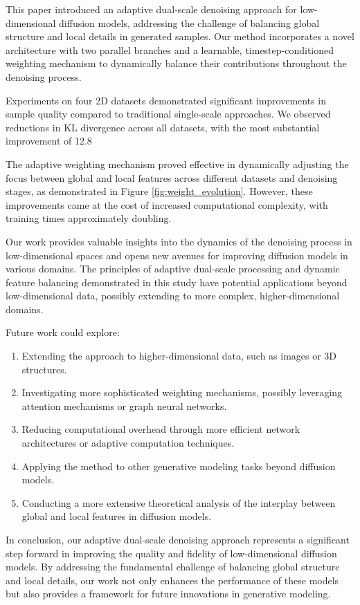 \documentclass{article} %
\begin{document}
This paper introduced an adaptive dual-scale denoising approach for low-dimensional diffusion models, addressing the challenge of balancing global structure and local details in generated samples. Our method incorporates a novel architecture with two parallel branches and a learnable, timestep-conditioned weighting mechanism to dynamically balance their contributions throughout the denoising process.

Experiments on four 2D datasets demonstrated significant improvements in sample quality compared to traditional single-scale approaches. We observed reductions in KL divergence across all datasets, with the most substantial improvement of 12.8%

The adaptive weighting mechanism proved effective in dynamically adjusting the focus between global and local features across different datasets and denoising stages, as demonstrated in Figure \ref{fig:weight_evolution}. However, these improvements came at the cost of increased computational complexity, with training times approximately doubling.

Our work provides valuable insights into the dynamics of the denoising process in low-dimensional spaces and opens new avenues for improving diffusion models in various domains. The principles of adaptive dual-scale processing and dynamic feature balancing demonstrated in this study have potential applications beyond low-dimensional data, possibly extending to more complex, higher-dimensional domains.

Future work could explore:

\begin{enumerate}
    \item Extending the approach to higher-dimensional data, such as images or 3D structures.
    \item Investigating more sophisticated weighting mechanisms, possibly leveraging attention mechanisms or graph neural networks.
    \item Reducing computational overhead through more efficient network architectures or adaptive computation techniques.
    \item Applying the method to other generative modeling tasks beyond diffusion models.
    \item Conducting a more extensive theoretical analysis of the interplay between global and local features in diffusion models.
\end{enumerate}

In conclusion, our adaptive dual-scale denoising approach represents a significant step forward in improving the quality and fidelity of low-dimensional diffusion models. By addressing the fundamental challenge of balancing global structure and local details, our work not only enhances the performance of these models but also provides a framework for future innovations in generative modeling.



\end{document}
